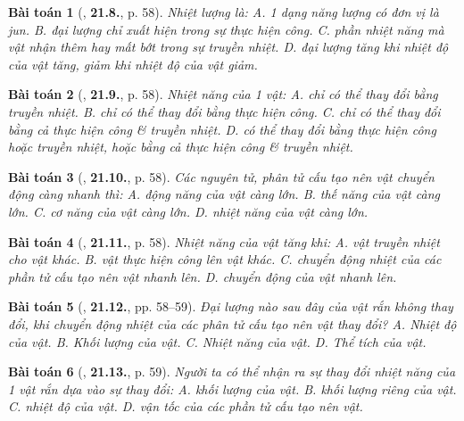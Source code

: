 \documentclass{article}
\numberwithin{equation}{section}
\newtheorem{baitoan}{Bài toán}
\begin{document}
\begin{baitoan}[\cite{SBT_Vat_Ly_8}, \textbf{21.8.}, p. 58]
	Nhiệt lượng là: {\sf A.} 1 dạng năng lượng có đơn vị là jun. {\sf B.} đại lượng chỉ xuất hiện trong sự thực hiện công. {\sf C.} phần nhiệt năng mà vật nhận thêm hay mất bớt trong sự truyền nhiệt. {\sf D.} đại lượng tăng khi nhiệt độ của vật tăng, giảm khi nhiệt độ của vật giảm.
\end{baitoan}

\begin{baitoan}[\cite{SBT_Vat_Ly_8}, \textbf{21.9.}, p. 58]
	Nhiệt năng của 1 vật: {\sf A.} chỉ có thể thay đổi bằng truyền nhiệt. {\sf B.} chỉ có thể thay đổi bằng thực hiện công. {\sf C.} chỉ có thể thay đổi bằng cả thực hiện công \& truyền nhiệt. {\sf D.} có thể thay đổi bằng thực hiện công hoặc truyền nhiệt, hoặc bằng cả thực hiện công \& truyền nhiệt.
\end{baitoan}

\begin{baitoan}[\cite{SBT_Vat_Ly_8}, \textbf{21.10.}, p. 58]
	Các nguyên tử, phân tử cấu tạo nên vật chuyển động càng nhanh thì: {\sf A.} động năng của vật càng lớn. {\sf B.} thế năng của vật càng lớn. {\sf C.} cơ năng của vật càng lớn. {\sf D.} nhiệt năng của vật càng lớn.
\end{baitoan}

\begin{baitoan}[\cite{SBT_Vat_Ly_8}, \textbf{21.11.}, p. 58]
	Nhiệt năng của vật tăng khi: {\sf A.} vật truyền nhiệt cho vật khác. {\sf B.} vật thực hiện công lên vật khác. {\sf C.} chuyển động nhiệt của các phần tử cấu tạo nên vật nhanh lên. {\sf D.} chuyển động của vật nhanh lên.
\end{baitoan}

\begin{baitoan}[\cite{SBT_Vat_Ly_8}, \textbf{21.12.}, pp. 58--59]
	Đại lượng nào sau đây của vật rắn không thay đổi, khi chuyển động nhiệt của các phân tử cấu tạo nên vật thay đổi? {\sf A.} Nhiệt độ của vật. {\sf B.} Khối lượng của vật. {\sf C.} Nhiệt năng của vật. {\sf D.} Thể tích của vật.
\end{baitoan}

\begin{baitoan}[\cite{SBT_Vat_Ly_8}, \textbf{21.13.}, p. 59]
	Người ta có thể nhận ra sự thay đổi nhiệt năng của 1 vật rắn dựa vào sự thay đổi: {\sf A.} khối lượng của vật. {\sf B.} khối lượng riêng của vật. {\sf C.} nhiệt độ của vật. {\sf D.} vận tốc của các phần tử cấu tạo nên vật.
\end{baitoan}
\end{document}
